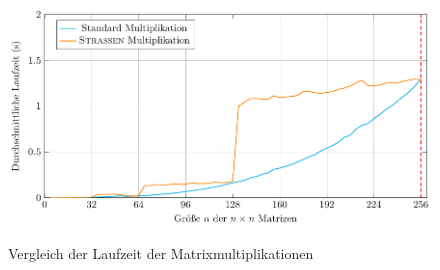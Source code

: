 \documentclass{scrartcl}
\begin{document}
\begin{figure}[h]
	\centering
	\caption{Vergleich der Laufzeit der Matrixmultiplikationen}
	\includegraphics[width=1.0\textwidth]{results.pdf}
	\label{fig:time-comparison}
\end{figure}
\end{document}
